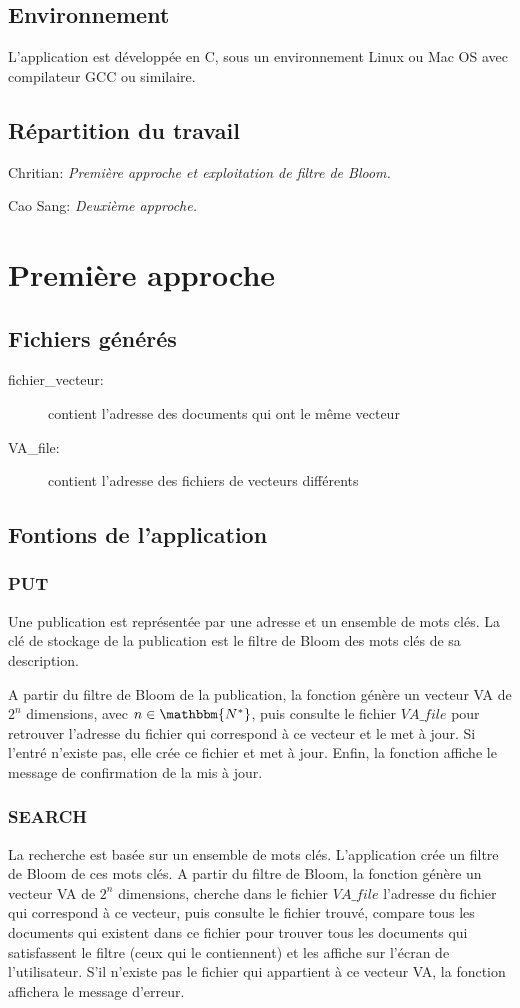\documentclass[a4paper,12pt]{report}
\begin{document}
	\section{Environnement}
		L’application est développée en C, sous un environnement Linux ou Mac OS avec compilateur GCC ou similaire.
		
	\section{Répartition du travail}
		Chritian: \textit{Première approche et exploitation de filtre de Bloom.}
		
		Cao Sang: \textit{Deuxième approche.}
		
\chapter{Première approche}
	\section{Fichiers générés}

	\begin{description}
		\item[fichier\_vecteur:] contient l'adresse des documents qui ont le même vecteur
		\item[VA\_file:] contient l'adresse des fichiers de vecteurs différents
	\end{description}
	
	\section{Fontions de l'application}
		\subsection{PUT}
		Une publication est représentée par une adresse et un ensemble de mots clés. La clé de stockage de la publication est le filtre de Bloom des mots clés de sa description.
		
	A partir du filtre de Bloom de la publication, la fonction génère un vecteur VA de $2^n$ dimensions, avec $n \in \mathbbm{N^*}$, puis consulte le fichier $VA\_file$ pour retrouver l’adresse du fichier qui correspond à ce vecteur et le met à jour. Si l’entré n’existe pas, elle crée ce fichier et met à jour. Enfin, la fonction affiche le message de confirmation de la mis à jour.
	
		\subsection{SEARCH}
		La recherche est basée sur un ensemble de mots clés. L’application crée un filtre de Bloom de ces mots clés.
 A partir du filtre de Bloom, la fonction génère un vecteur VA de $2^n$ dimensions, cherche dans le fichier $VA\_file$ l’adresse du fichier qui correspond à ce vecteur, puis consulte le fichier trouvé, compare tous les documents qui existent dans ce fichier pour trouver tous les documents qui satisfassent le filtre (ceux qui le contiennent) et les affiche sur l’écran de l'utilisateur. S’il n’existe pas le fichier qui appartient à ce vecteur VA, la fonction affichera le message d’erreur.
\end{document}
